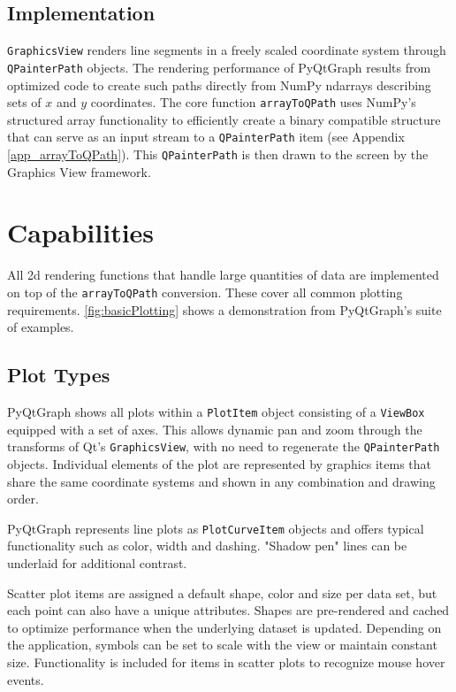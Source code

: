 \documentclass[journal]{vgtc}                %
\begin{document}
\subsection{Implementation}
\texttt{GraphicsView} renders line segments in a freely scaled coordinate system through \texttt{QPainterPath} objects. The rendering performance of PyQtGraph results from optimized code to create such paths directly from NumPy ndarrays describing sets of $x$ and $y$ coordinates. The core function \texttt{arrayToQPath} uses NumPy's structured array functionality to efficiently create a binary compatible structure that can serve as an input stream to a \texttt{QPainterPath} item (see Appendix \autoref{app_arrayToQPath}). This \texttt{QPainterPath} is then drawn to the screen by the Graphics View framework.

\section{Capabilities}

All 2d rendering functions that handle large quantities of data are implemented on top of the \texttt{arrayToQPath} conversion. These cover all common plotting requirements. \autoref{fig:basicPlotting} shows a demonstration from PyQtGraph's suite of examples.

\subsection{Plot Types}

PyQtGraph shows all plots within a \texttt{PlotItem} object consisting of a \texttt{ViewBox} equipped with a set of axes. This allows dynamic pan and zoom through the transforms of Qt's \texttt{GraphicsView}, with no need to regenerate the \texttt{QPainterPath} objects. Individual elements of the plot are represented by graphics items that share the same coordinate systems and shown in any combination and drawing order. 

PyQtGraph represents line plots as \texttt{PlotCurveItem} objects and offers typical functionality such as color, width and dashing. "Shadow pen" lines can be underlaid for additional contrast. 

Scatter plot items are assigned a default shape, color and size per data set, but each point can also have a unique attributes. Shapes are pre-rendered and cached to optimize performance when the underlying dataset is updated. Depending on the application, symbols can be set to scale with the view or maintain constant size.  Functionality is included for items in scatter plots to recognize mouse hover events.
\end{document}

